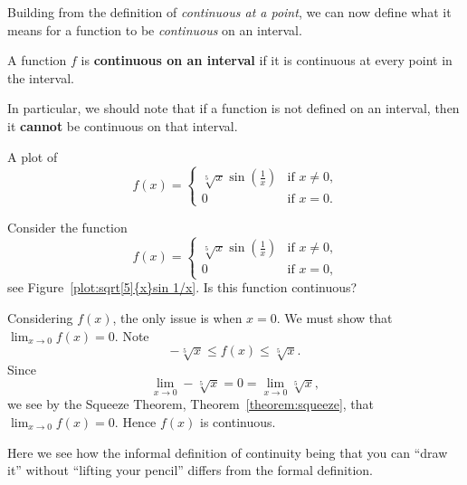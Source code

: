 Building from the definition of \textit{continuous at a point}, we can
now define what it means for a function to be \textit{continuous} on
an interval.

\begin{definition} A function $f$ is \textbf{continuous on an interval} if it is
continuous at every point in the interval.
\end{definition}

In particular, we should note that if a function is not defined on an
interval, then it \textbf{cannot} be continuous on that interval.
\begin{marginfigure}[0in]
\caption[A continuous function.]{A plot of
\[
f(x)=
\begin{cases}
\sqrt[5]{x}\sin\left(\frac{1}{x}\right) & \text{if $x \ne 0$,}\\
 0 & \text{if $x = 0$.}
\end{cases}
\]
}
\label{plot:sqrt[5]{x}sin 1/x}
\end{marginfigure}

\begin{example}
Consider the function
\[
f(x) = 
\begin{cases}
\sqrt[5]{x}\sin\left(\frac{1}{x}\right) & \text{if $x \ne 0$,}\\
0 & \text{if $x = 0$,}
\end{cases}
\]
see Figure~\ref{plot:sqrt[5]{x}sin 1/x}. Is this function continuous?
\end{example}

\begin{solution}
Considering $f(x)$, the only issue is when $x=0$. We must show that
$\lim_{x\to 0} f(x) = 0$. Note
\[
-\sqrt[5]{x}\le f(x) \le \sqrt[5]{x}.
\]
Since
\[
\lim_{x\to 0} -\sqrt[5]{x} = 0 = \lim_{x\to 0}\sqrt[5]{x},
\]
we see by the Squeeze Theorem, Theorem~\ref{theorem:squeeze}, that
$\lim_{x\to 0} f(x) = 0$. Hence $f(x)$ is continuous.

Here we see how the informal definition of continuity being that you
can ``draw it'' without ``lifting your pencil'' differs from the
formal definition.
\end{solution}

